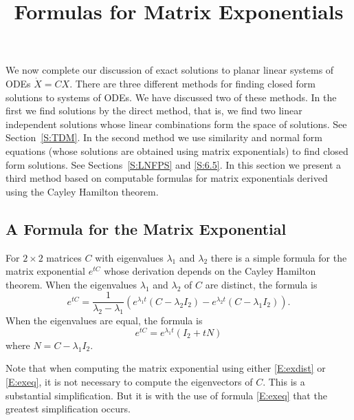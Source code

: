 \documentclass{ximera}
\title{Formulas for Matrix Exponentials}
\begin{document}
\begin{abstract}
\end{abstract}
\maketitle


\label{S:6.6}

We now complete our discussion of exact solutions to planar linear systems of
ODEs $\dot{X}=CX$.  There are three different methods for finding closed form
solutions to systems of ODEs.  We have discussed two of these methods.  In
the first we find solutions by the direct method, that is, we find two linear
independent solutions whose linear combinations form the space of solutions.
See Section~\ref{S:TDM}.  In the second method we use similarity and normal
form equations (whose solutions are obtained using matrix exponentials) to
find closed form solutions.  See Sections~\ref{S:LNFPS} and \ref{S:6.5}.
In this section we present a third method based on computable formulas for
matrix exponentials derived using the Cayley Hamilton theorem.

\subsection*{A Formula for the Matrix Exponential}

For $2\times 2$ matrices $C$ with eigenvalues $\lambda_1$ and $\lambda_2$
there is a simple formula for the matrix exponential $e^{tC}$ whose
derivation depends on the Cayley Hamilton theorem.   When the eigenvalues $\lambda_1$ and $\lambda_2$ of $C$ are
distinct, the formula is
\begin{equation}  \label{E:exdist}
e^{tC} = \frac{1}{\lambda_2-\lambda_1}\left(e^{\lambda_1 t}(C-\lambda_2I_2) -
e^{\lambda_2 t}(C-\lambda_1I_2)\right).
\end{equation}
When the eigenvalues are equal, the formula is
\begin{equation}  \label{E:exeq}
e^{tC} = e^{\lambda_1 t}(I_2 + tN)
\end{equation}
where $N = C - \lambda_1I_2$.

Note that when computing the matrix exponential using either \eqref{E:exdist}
or \eqref{E:exeq}, it is not necessary to compute the eigenvectors of $C$.
This is a substantial simplification.  But it is with the use of formula
\eqref{E:exeq} that the greatest simplification occurs.
\end{document}
